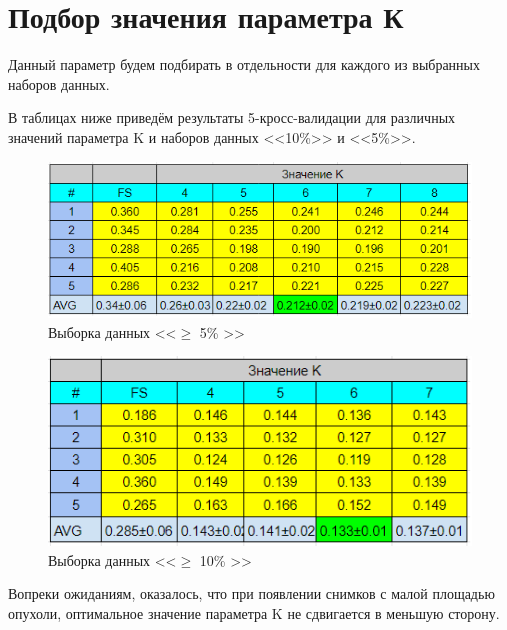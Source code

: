\pagebreak
\section{Подбор значения параметра К}

Данный параметр будем подбирать в отдельности для каждого из выбранных наборов данных. 

В таблицах ниже приведём результаты 5-кросс-валидации для различных значений параметра K и наборов данных <<10\%>> и <<5\%>>.



\begin{figure}[h!] 
  \center
  \includegraphics [scale=1.0] {images/5_percent_experience.png}
  \caption{ Выборка данных <<$\ge$ 5\% >>} 
  \label{fig:5_perc}  
\end{figure}


\begin{figure}[h!] 
  \center
  \includegraphics [scale=1.0] {images/10_percent_experience.png}
  \caption{ Выборка данных <<$\ge$ 10\% >>} 
  \label{fig:10_perc}  
\end{figure}

Вопреки ожиданиям, оказалось, что при появлении снимков с малой площадью опухоли, оптимальное значение параметра K не сдвигается в меньшую сторону.

\newpage

